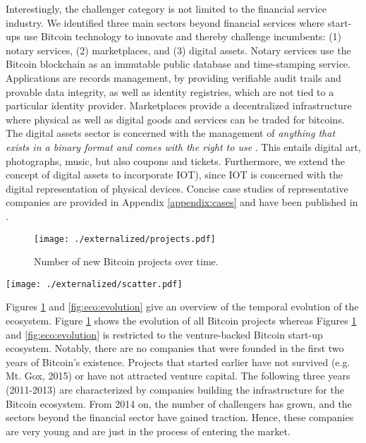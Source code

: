 Interestingly, the challenger category is not limited to the financial service 
industry. We identified three main sectors beyond financial services where start-ups 
use Bitcoin technology to innovate and thereby challenge incumbents: (1) notary 
services, (2) marketplaces, and (3) digital assets. Notary services use the Bitcoin 
blockchain as an immutable public database and time-stamping service. Applications 
are records management, by providing verifiable audit trails and provable data 
integrity, as well as identity registries, which are not tied to a particular identity 
provider. Marketplaces provide a decentralized infrastructure where physical as 
well as digital goods and services can be traded for bitcoins. The digital assets 
sector is concerned with the management of \emph{anything that exists in a binary format 
and comes with the right to use} \parencite{wikipedia2016da}. This entails digital art, 
photographs, music, but also coupons and tickets. Furthermore, we extend the 
concept of digital assets to incorporate \ac{IOT}), since \ac{IOT} 
is concerned with the digital representation of physical devices. Concise case studies of representative companies are provided in Appendix \ref{appendix:cases} and have been published in \parencite{Worner2016ecis}. 

\begin{figure}
\centering
\texttt{[image: ./externalized/projects.pdf]}
\caption{Number of new Bitcoin projects over time.}
\label{fig:eco:projects}
\end{figure}

\begin{sidewaysfigure}
\centering
\texttt{[image: ./externalized/scatter.pdf]}
\caption{Evolution of the venture-backed Bitcoin start-up ecosystem.}
\label{fig:eco:evolution}
\end{sidewaysfigure}

Figures \ref{fig:eco:projects} and \ref{fig:eco:evolution} give an overview of the temporal evolution of the ecosystem. Figure 
\ref{fig:eco:projects} shows the evolution of all Bitcoin projects whereas 
Figures \ref{fig:eco:projects} and \ref{fig:eco:evolution} is restricted to 
the venture-backed Bitcoin start-up ecosystem. Notably, there are no companies 
that were founded in the first two years of Bitcoin's existence. Projects that 
started earlier have not survived (e.g. Mt. Gox, 2015) or have not attracted venture 
capital. The following three years (2011-2013) are characterized by companies building 
the infrastructure for the Bitcoin ecosystem. From 2014 on, the number of challengers 
has grown, and the sectors beyond the financial sector have gained traction. Hence, 
these companies are very young and are just in the process of entering the market.

